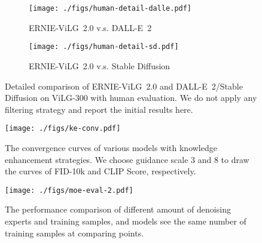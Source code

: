 \documentclass[10pt,twocolumn,letterpaper]{article}
\begin{document}
\begin{figure}[t]
    \centering
    \begin{subfigure}{\linewidth}
        \texttt{[image: ./figs/human-detail-dalle.pdf]}
        \caption{ERNIE-ViLG~2.0 v.s. DALL-E~2}
        \label{fig:human_detail_dalle}
    \end{subfigure}
    \begin{subfigure}{\linewidth}
        \texttt{[image: ./figs/human-detail-sd.pdf]}
        \caption{ERNIE-ViLG~2.0 v.s. Stable Diffusion}
        \label{fig:human_detail_sd}
    \end{subfigure}
    \caption{Detailed comparison of ERNIE-ViLG~2.0 and DALL-E~2/Stable Diffusion on ViLG-300 with human evaluation. We do not apply any filtering strategy and report the initial results here.}
    \label{fig:human_detail}
\end{figure}


\begin{figure}[t]
    \centering
        \texttt{[image: ./figs/ke-conv.pdf]}
    \caption{The convergence curves of various models with knowledge enhancement strategies. We choose guidance scale 3 and 8 to draw the curves of FID-10k and CLIP Score, respectively.}
    \label{fig:ke_conv}
\end{figure}

\begin{figure}[t]
    \centering
        \texttt{[image: ./figs/moe-eval-2.pdf]}
    \caption{The performance comparison of different amount of denoising experts and training samples, and models see the same number of training samples at comparing points.}
    \label{fig:moe_eval_2}
\end{figure}
\end{document}
